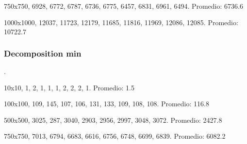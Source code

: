 \documentclass[conference]{IEEEtran}
\begin{document}
750x750, 6928, 6772, 6787, 6736, 6775, 6457, 6831, 6961, 6494.
\newline
Promedio: 6736.6
\newline

1000x1000, 12037, 11723, 12179, 11685, 11816, 11969, 12086, 12085.
\newline
Promedio: 10722.7\newline
{}



\subsubsection{Decomposition min}

.
\newline

10x10, 1, 2, 1, 1, 1, 2, 2, 2, 1.
\newline
Promedio: 1.5
\newline

100x100, 109, 145, 107, 106, 131, 133, 109, 108, 108.
\newline
Promedio: 116.8 
\newline

500x500, 3025, 287, 3040, 2903, 2956, 2997, 3048, 3072.
\newline
Promedio: 2427.8
\newline

750x750, 7013, 6794, 6683, 6616, 6756, 6748, 6699, 6839.
\newline
Promedio: 6082.2
\newline
\end{document}
